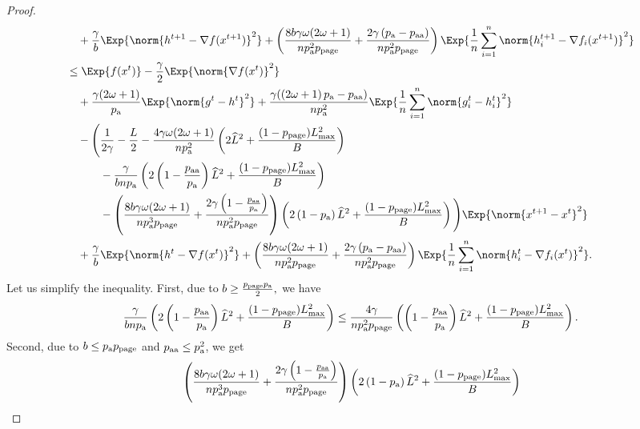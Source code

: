 \documentclass{article}
\newcommand*{\probavailable}{\ensuremath{p_{\textnormal{a}}}}
\newcommand*{\probpairaa}{\ensuremath{p_{\textnormal{aa}}}}
\newcommand*{\probpage}{\ensuremath{p_{\text{page}}}}
\begin{document}
\begin{proof}
\begin{align*}
      &\quad  + \frac{\gamma}{b} \Exp{\norm{h^{t+1} - \nabla f(x^{t+1})}^2} + \left(\frac{8 b \gamma \omega (2 \omega + 1)}{n \probavailable^2 \probpage} + \frac{2 \gamma \left(\probavailable - \probpairaa\right)}{n \probavailable^2 \probpage}\right) \Exp{\frac{1}{n}\sum_{i=1}^n\norm{h^{t+1}_i - \nabla f_i(x^{t+1})}^2}\\
      &\leq \Exp{f(x^t)} - \frac{\gamma}{2}\Exp{\norm{\nabla f(x^t)}^2} \\
      &\quad + \frac{\gamma (2 \omega + 1)}{\probavailable} \Exp{\norm{g^{t} - h^{t}}^2} + \frac{\gamma (\left(2 \omega + 1\right)\probavailable - \probpairaa)}{n \probavailable^2} \Exp{\frac{1}{n}\sum_{i=1}^n\norm{g^{t}_i - h^{t}_i}^2} \\
      &\quad - \Bigg(\frac{1}{2\gamma} - \frac{L}{2} - \frac{4 \gamma \omega (2 \omega + 1)}{n \probavailable^2} \left(2 \widehat{L}^2 + \frac{(1 - \probpage)L_{\max}^2}{B}\right) \\
      &\qquad\quad - \frac{\gamma}{b n \probavailable}\left(2 \left(1 - \frac{\probpairaa}{\probavailable}\right) \widehat{L}^2 + \frac{(1 - \probpage)L_{\max}^2}{B}\right) \\
      &\qquad\quad- \left(\frac{8 b \gamma \omega (2 \omega + 1)}{n \probavailable^3 \probpage} + \frac{2 \gamma \left(1 - \frac{\probpairaa}{\probavailable}\right)}{n \probavailable^2 \probpage}\right) \left(2\left(1 - \probavailable\right)\widehat{L}^2 + \frac{(1 - \probpage)L_{\max}^2}{B}\right)\Bigg) \Exp{\norm{x^{t+1} - x^t}^2} \\
      &\quad + \frac{\gamma}{b}\Exp{\norm{h^{t} - \nabla f(x^{t})}^2} + \left(\frac{8 b \gamma \omega (2 \omega + 1)}{n \probavailable^2 \probpage} + \frac{2 \gamma \left(\probavailable - \probpairaa\right)}{n \probavailable^2 \probpage}\right)\Exp{\frac{1}{n}\sum_{i=1}^n\norm{h^{t}_i - \nabla f_i(x^{t})}^2}.
    \end{align*}
    Let us simplify the inequality. First, due to $b \geq \frac{\probpage \probavailable}{2},$ we have
    $$\frac{\gamma}{b n \probavailable}\left(2 \left(1 - \frac{\probpairaa}{\probavailable}\right) \widehat{L}^2 + \frac{(1 - \probpage)L_{\max}^2}{B}\right) \leq \frac{4 \gamma}{n \probavailable^2 \probpage}\left(\left(1 - \frac{\probpairaa}{\probavailable}\right) \widehat{L}^2 + \frac{(1 - \probpage)L_{\max}^2}{B}\right).$$
    Second, due to $b \leq \probavailable \probpage$ and $\probpairaa \leq \probavailable^2$, we get
    \begin{align*}
      &\left(\frac{8 b \gamma \omega (2 \omega + 1)}{n \probavailable^3 \probpage} + \frac{2 \gamma \left(1 - \frac{\probpairaa}{\probavailable}\right)}{n \probavailable^2 \probpage}\right) \left(2\left(1 - \probavailable\right)\widehat{L}^2 + \frac{(1 - \probpage)L_{\max}^2}{B}\right) \\

\end{align*}
\end{proof}
\end{document}
